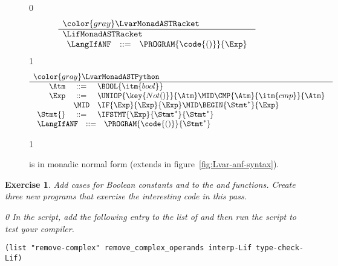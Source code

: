 \documentclass[7x10]{TimesAPriori_MIT}%
\newcommand{\gray}[1]{{\color{gray} #1}}
\def\racketEd{0}
\def\pythonEd{1}
\def\edition{1}
\newcommand{\pythonColor}[0]{}
\newcommand{\python}[1]{{\if\edition\pythonEd\pythonColor #1\fi}}
\newtheorem{exercise}[theorem]{Exercise}
\numberwithin{theorem}{chapter}
\numberwithin{definition}{chapter}
\numberwithin{equation}{chapter}
\begin{document}
\newcommand{\LifMonadASTPython}{
\begin{array}{rcl}
\Atm &::=& \BOOL{\itm{bool}}\\
\Exp &::=& \UNIOP{\key{Not()}}{\Atm}
           \MID \CMP{\Atm}{\itm{cmp}}{\Atm} \\
   &\MID& \IF{\Exp}{\Exp}{\Exp} 
    \MID \BEGIN{\Stmt^{*}}{\Exp}\\
\Stmt{} &::=& \IFSTMT{\Exp}{\Stmt^{*}}{\Stmt^{*}}
\end{array}
}

\begin{figure}[tp]
\centering
\begin{tcolorbox}[colback=white]
{\if\edition\racketEd    
\[
\begin{array}{l}
  \gray{\LvarMonadASTRacket} \\ \hline
  \LifMonadASTRacket \\
\begin{array}{rcl}
\LangIfANF  &::=& \PROGRAM{\code{()}}{\Exp}
\end{array}
\end{array}
\]
\fi}
{\if\edition\pythonEd\pythonColor
\[
\begin{array}{l}
  \gray{\LvarMonadASTPython} \\ \hline
  \LifMonadASTPython \\
   \begin{array}{rcl}
     \LangIfANF  &::=& \PROGRAM{\code{()}}{\Stmt^{*}}
   \end{array}
\end{array}
\]
\fi}
\end{tcolorbox}
\python{}
\caption{\LangIfANF{} is \LangIf{} in monadic normal form
  (extends \LangVarANF in figure~\ref{fig:Lvar-anf-syntax}).}
\label{fig:Lif-anf-syntax}
\end{figure}


\begin{exercise}\normalfont\normalsize
%
Add cases for Boolean constants and  to the 
and  functions.
%
Create three new \LangIf{} programs that exercise the interesting
code in this pass.
%
{\if\edition\racketEd    
In the  script, add the following entry to the
list of  and then run the script to test your compiler.
\begin{lstlisting}
(list "remove-complex" remove_complex_operands interp-Lif type-check-Lif)
\end{lstlisting}
\fi}
\end{exercise}
\end{document}
